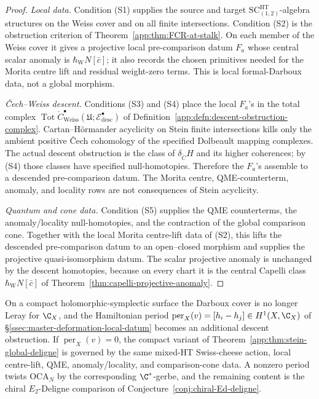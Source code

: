 \begin{proof}
\emph{Local data.}  Condition \textup{(S1)} supplies the source and
target \(\mathrm{SC}^{\mathrm{HT}}_{(1,2)}\)-algebra structures on the
Weiss cover and on all finite intersections.  Condition \textup{(S2)}
is the obstruction criterion of Theorem~\ref{app:thm:FCR-at-stalk}.
On each member of the Weiss cover it gives a projective local
pre-comparison datum \(F_a\) whose central scalar anomaly is
\(\hbar_{\mathrm{W}} N[\bar c]\);
it also records the chosen primitives needed for the Morita centre lift
and residual weight-zero terms.  This is local formal-Darboux data, not
a global morphism.

\emph{\v Cech--Weiss descent.}  Conditions \textup{(S3)} and
\textup{(S4)} place the local \(F_a\)'s in the total complex
\(\operatorname{Tot}\check C^\bullet_{\mathrm{Weiss}}
(\mathfrak U;\mathcal E^\bullet_{\mathrm{desc}})\) of
Definition~\ref{app:defn:descent-obstruction-complex}.  Cartan--H\"ormander
acyclicity on Stein finite intersections kills only the ambient positive
\v Cech cohomology of the specified Dolbeault mapping complexes.  The
actual descent obstruction is the class of \(\delta_{\check C}H\) and
its higher coherences; by \textup{(S4)} those classes have specified
null-homotopies.  Therefore the \(F_a\)'s assemble to a descended
pre-comparison datum.  The Morita centre, QME-counterterm, anomaly, and locality
rows are not consequences of Stein acyclicity.

\emph{Quantum and cone data.}  Condition \textup{(S5)} supplies the QME
counterterms, the anomaly/locality null-homotopies, and the contraction
of the global comparison cone.  Together with the local Morita
centre-lift data of \textup{(S2)}, this lifts the descended
pre-comparison datum to an open--closed morphism and supplies the
projective quasi-isomorphism datum.  The scalar projective anomaly is
unchanged by the descent homotopies, because on every chart it is the
central Capelli class \(\hbar_{\mathrm{W}} N[\bar c]\) of
Theorem~\ref{thm:capelli-projective-anomaly}.
\end{proof}

\begin{rmk}\label{app:rmk:compact-period-twist}
On a compact holomorphic-symplectic surface the Darboux cover is no
longer Leray for \(\C_X\), and the Hamiltonian period
\(\operatorname{per}_X(v)=[h_i-h_j]\in H^1(X,\C_X)\) of
\S\ref{ssec:master-deformation-local-datum} becomes an additional
descent obstruction.  If \(\operatorname{per}_X(v)=0\), the compact
variant of Theorem~\ref{app:thm:stein-global-deligne} is governed by the
same mixed-HT Swiss-cheese action, local centre-lift, QME,
anomaly/locality, and comparison-cone data.  A
nonzero period twists \(\mathrm{OCA}_N\) by the corresponding
\(\C^*\)-gerbe, and the remaining content is the chiral
\(E_2\)-Deligne comparison of Conjecture~\ref{conj:chiral-Ed-deligne}.
\end{rmk}

